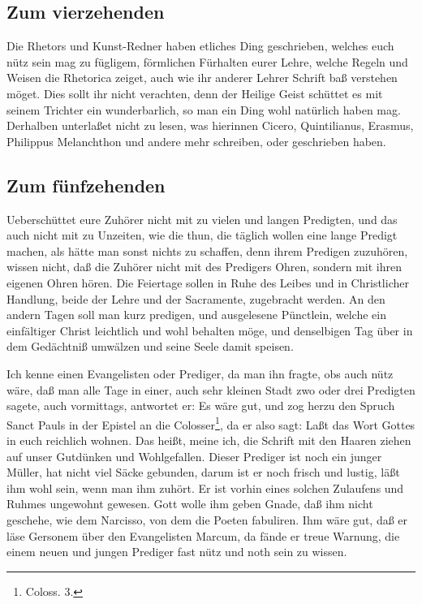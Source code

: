 \subsection{Zum vierzehenden}

Die Rhetors und Kunst-Redner haben etliches Ding geschrieben, welches euch nütz sein mag zu fügligem, förmlichen Fürhalten eurer Lehre, welche Regeln und Weisen die Rhetorica zeiget, auch wie ihr anderer Lehrer Schrift baß verstehen möget. Dies sollt ihr nicht verachten, denn der Heilige Geist schüttet es mit seinem Trichter ein wunderbarlich, so man ein Ding wohl natürlich haben mag. Derhalben unterlaßet nicht zu lesen, was hierinnen Cicero, Quintilianus, Erasmus, Philippus Melanchthon und andere mehr schreiben, oder geschrieben haben.

\subsection{Zum fünfzehenden}

Ueberschüttet eure Zuhörer nicht mit zu vielen und langen Predigten, und das auch nicht mit zu Unzeiten, wie die thun, die täglich wollen eine lange Predigt machen, als hätte man sonst nichts zu schaffen, denn ihrem Predigen zuzuhören, wissen nicht, daß die Zuhörer nicht mit des Predigers Ohren, sondern mit ihren eigenen Ohren hören. Die Feiertage sollen in Ruhe des Leibes und in Christlicher Handlung, beide der Lehre und der Sacramente, zugebracht werden. An den andern Tagen soll man kurz predigen, und ausgelesene Pünctlein, welche ein einfältiger Christ leichtlich und wohl behalten möge, und denselbigen Tag über in dem Gedächtniß umwälzen und seine Seele damit speisen.

Ich kenne einen Evangelisten oder Prediger, da man ihn fragte, obs auch nütz wäre, daß man alle Tage in einer, auch sehr kleinen Stadt zwo oder drei Predigten sagete, auch vormittags, antwortet er: Es wäre gut, und zog herzu den Spruch
Sanct Pauls in der Epistel an die Colosser\footnote{Coloss. 3.}, da er also sagt: Laßt das Wort Gottes in euch reichlich wohnen. Das heißt, meine ich, die Schrift mit den Haaren ziehen auf unser Gutdünken und Wohlgefallen. Dieser Prediger ist noch ein junger Müller, hat nicht viel Säcke gebunden, darum ist er noch frisch und lustig, läßt ihm wohl sein, wenn man ihm zuhört. Er ist vorhin eines solchen Zulaufens und Ruhmes ungewohnt gewesen. Gott wolle ihm geben Gnade, daß ihm nicht geschehe, wie dem Narcisso, von dem die Poeten fabuliren. Ihm wäre gut, daß er läse Gersonem über den Evangelisten Marcum, da fände er treue Warnung, die einem neuen und jungen Prediger fast nütz und noth sein zu wissen.

